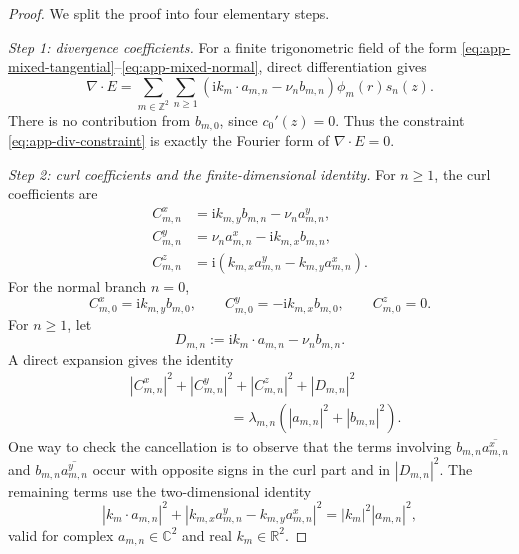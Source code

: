\documentclass[11pt]{article}
\providecommand{\R}{\mathbb{R}}
\providecommand{\C}{\mathbb{C}}
\providecommand{\Z}{\mathbb{Z}}
\providecommand{\ii}{\mathrm{i}}
\providecommand{\abs}[1]{\left\lvert #1\right\rvert}
\providecommand{\paren}[1]{\left(#1\right)}
\numberwithin{equation}{section}
\begin{document}
\begin{proof}
We split the proof into four elementary steps.

\emph{Step 1: divergence coefficients.}
For a finite trigonometric field of the form
\eqref{eq:app-mixed-tangential}--\eqref{eq:app-mixed-normal}, direct
differentiation gives
\begin{equation}
\label{eq:app-div-expansion}
    \nabla\cdot E
    =
    \sum_{m\in\Z^2}\sum_{n\ge1}
    \paren{\ii k_m\cdot a_{m,n}-\nu_n b_{m,n}}
    \phi_m(r)s_n(z).
\end{equation}
There is no contribution from \(b_{m,0}\), since \(c_0'(z)=0\).  Thus the
constraint \eqref{eq:app-div-constraint} is exactly the Fourier form of
\(\nabla\cdot E=0\).

\emph{Step 2: curl coefficients and the finite-dimensional identity.}
For \(n\ge1\), the curl coefficients are
\begin{align}
\label{eq:app-curl-coeffs-positive-n}
    C^x_{m,n}&=\ii k_{m,y}b_{m,n}-\nu_n a^y_{m,n},\nonumber\\
    C^y_{m,n}&=\nu_n a^x_{m,n}-\ii k_{m,x}b_{m,n},\\
    C^z_{m,n}&=\ii\paren{k_{m,x}a^y_{m,n}-k_{m,y}a^x_{m,n}}.\nonumber
\end{align}
For the normal branch \(n=0\),
\begin{equation}
\label{eq:app-curl-coeffs-zero-n}
    C^x_{m,0}=\ii k_{m,y}b_{m,0},
    \qquad
    C^y_{m,0}=-\ii k_{m,x}b_{m,0},
    \qquad
    C^z_{m,0}=0 .
\end{equation}
For \(n\ge1\), let
\[
    D_{m,n}:=\ii k_m\cdot a_{m,n}-\nu_n b_{m,n} .
\]
A direct expansion gives the identity
\begin{align}
\label{eq:app-curl-div-identity}
    &\abs{C^x_{m,n}}^2+
     \abs{C^y_{m,n}}^2+
     \abs{C^z_{m,n}}^2+
     \abs{D_{m,n}}^2        \\
    &\hspace{3cm}=
     \lambda_{m,n}
     \paren{\abs{a_{m,n}}^2+\abs{b_{m,n}}^2} .\nonumber
\end{align}
One way to check the cancellation is to observe that the terms involving
\(b_{m,n}\overline{a^x_{m,n}}\) and \(b_{m,n}\overline{a^y_{m,n}}\) occur with
opposite signs in the curl part and in \(\abs{D_{m,n}}^2\).  The remaining
terms use the two-dimensional identity
\[
    \abs{k_m\cdot a_{m,n}}^2+
    \abs{k_{m,x}a^y_{m,n}-k_{m,y}a^x_{m,n}}^2
    =
    \abs{k_m}^2\abs{a_{m,n}}^2,
\]
valid for complex \(a_{m,n}\in\C^2\) and real \(k_m\in\R^2\).


\end{proof}
\end{document}
